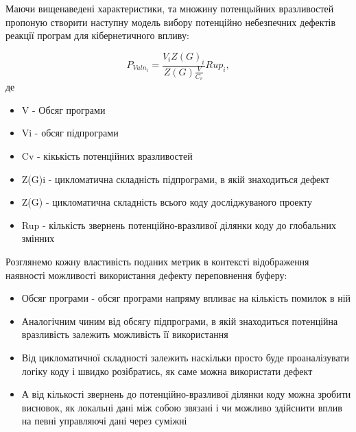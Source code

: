 Маючи вищенаведені характеристики, та множину потенцыйних вразливостей пропоную створити наступну модель вибору потенційно небезпечних дефектів реакції програм для кібернетичного впливу:

\begin{equation}\label{eq:my_equation}
 P_{Vuln_i} = \frac{V_i Z(G)_i}{Z(G) \frac{V}{C_v}}Rup_i, 
\end{equation}
де

\begin{itemize}
\item {} 
V - Обсяг програми

\item {} 
Vi - обсяг підпрограми

\item {} 
Cv - кікькість потенційних вразливостей

\item {} 
Z(G)i - цикломатична складність підпрограми, в якій знаходиться дефект

\item {} 
Z(G) - цикломатична складність всього коду досліджуваного проекту

\item {} 
Rup - кількість звернень потенційно-вразливої ділянки коду до глобальних змінних

\end{itemize}

Розглянемо кожну властивість поданих метрик в контексті відображення наявності можливості використання дефекту переповнення буферу:
\begin{itemize}
\item {} 
Обсяг програми - обсяг програми напряму впливає на кількість помилок в ній

\item {} 
Аналогічним чиним від обсягу підпрограми, в якій знаходиться потенційна вразливість залежить можливість її використання

\item {} 
Від цикломатичної складності залежить наскільки просто буде проаналізувати логіку коду і швидко розібратись, як саме можна використати дефект

\item {} 
А від кількості звернень до потенційно-вразливої ділянки коду можна зробити висновок, як локальні дані між собою звязані і чи можливо здійснити вплив на певні управляючі дані через суміжні

\end{itemize}

